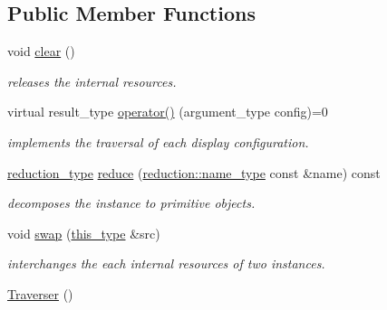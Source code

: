 \subsection*{Public Member Functions}
\begin{DoxyCompactItemize}
\item 
\hypertarget{classhryky_1_1display_1_1_traverser_acb0875c02060747ef7407663c1dba492}{void \hyperlink{classhryky_1_1display_1_1_traverser_acb0875c02060747ef7407663c1dba492}{clear} ()}\label{classhryky_1_1display_1_1_traverser_acb0875c02060747ef7407663c1dba492}

\begin{DoxyCompactList}\small\item\em releases the internal resources. \end{DoxyCompactList}\item 
virtual result\-\_\-type \hyperlink{classhryky_1_1display_1_1_traverser_aea08c97fa5b3aea2f2173b7aeef1044a}{operator()} (argument\-\_\-type config)=0
\begin{DoxyCompactList}\small\item\em implements the traversal of each display configuration. \end{DoxyCompactList}\item 
\hypertarget{classhryky_1_1display_1_1_traverser_a11a530ae46d01adeba0c92c0ef45d83b}{\hyperlink{namespacehryky_a343a9a4c36a586be5c2693156200eadc}{reduction\-\_\-type} \hyperlink{classhryky_1_1display_1_1_traverser_a11a530ae46d01adeba0c92c0ef45d83b}{reduce} (\hyperlink{namespacehryky_1_1reduction_ac686c30a4c8d196bbd0f05629a6b921f}{reduction\-::name\-\_\-type} const \&name) const }\label{classhryky_1_1display_1_1_traverser_a11a530ae46d01adeba0c92c0ef45d83b}

\begin{DoxyCompactList}\small\item\em decomposes the instance to primitive objects. \end{DoxyCompactList}\item 
\hypertarget{classhryky_1_1display_1_1_traverser_a6e618d472947eb171c5ce80af4c55dc2}{void \hyperlink{classhryky_1_1display_1_1_traverser_a6e618d472947eb171c5ce80af4c55dc2}{swap} (\hyperlink{classhryky_1_1display_1_1_traverser_a96d51504370e112d234076449e2fec47}{this\-\_\-type} \&src)}\label{classhryky_1_1display_1_1_traverser_a6e618d472947eb171c5ce80af4c55dc2}

\begin{DoxyCompactList}\small\item\em interchanges the each internal resources of two instances. \end{DoxyCompactList}\item 
\hypertarget{classhryky_1_1display_1_1_traverser_a6ea76dfd47de0a8baf0eb9855d6dc069}{\hyperlink{classhryky_1_1display_1_1_traverser_a6ea76dfd47de0a8baf0eb9855d6dc069}{Traverser} ()}\label{classhryky_1_1display_1_1_traverser_a6ea76dfd47de0a8baf0eb9855d6dc069}


\end{DoxyCompactItemize}
